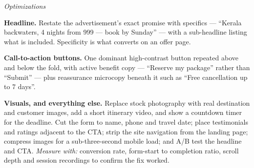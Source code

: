 \begin{qlist}
\textit{Optimizations}
\begin{apts}\setcounter{enumi}{7}
\item \textbf{Headline.} Restate the advertisement's exact promise with
      specifics --- ``Kerala backwaters, 4 nights from 999 --- book by
      Sunday'' --- with a sub-headline listing what is included. Specificity is
      what converts on an offer page.
\item \textbf{Call-to-action buttons.} One dominant high-contrast button
      repeated above and below the fold, with active benefit copy --- ``Reserve
      my package'' rather than ``Submit'' --- plus reassurance microcopy beneath
      it such as ``Free cancellation up to 7 days''.
\item \textbf{Visuals, and everything else.} Replace stock photography with real
      destination and customer images, add a short itinerary video, and show a
      countdown timer for the deadline. Cut the form to name, phone and travel
      date; place testimonials and ratings adjacent to the CTA; strip the site
      navigation from the landing page; compress images for a sub-three-second
      mobile load; and A/B test the headline and CTA. \emph{Measure with:}
      conversion rate, form-start to completion ratio, scroll depth and session
      recordings to confirm the fix worked.
\end{apts}


\end{qlist}
